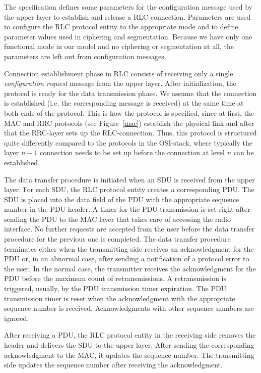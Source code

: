 \documentclass{entcs} \usepackage{entcsmacro}
\begin{document}
The specification defines some parameters for the configuration
message used by the upper layer to establish and release a RLC
connection. Parameters are used to configure the RLC protocol entity
to the appropriate mode and to define parameter values used in
ciphering and segmentation. Because we have only one functional mode
in our model and no ciphering or segmentation at all, the parameters
are left out from configuration messages.

Connection establishment phase in RLC consists of receiving only a
single {\em configuration request} message from the upper layer. After
initialization, the protocol is ready for the data transmission phase.
We assume that the connection is established (i.e. the corresponding
message is received) at the same time at both ends of the
protocol. This is how the protocol is specified, since at first, the
MAC and RRC protocols (see Figure~\ref{mac}) establish the physical
link and after that the RRC-layer sets up the RLC-connection. Thus,
this protocol is structured quite differently compared to the protocols in
the OSI-stack, where typically the layer $n-1$ connection needs to be
set up before the connection at level $n$ can be established.

The data transfer procedure is initiated when an SDU is received from
the upper layer. For each SDU, the RLC protocol entity creates a
corresponding PDU. The SDU is placed into the data field of the PDU
with the appropriate sequence number in the PDU header. A timer for
the PDU transmission is set right after sending the PDU to the MAC
layer that takes care of accessing the radio interface.  No further
requests are accepted from the user before the data transfer procedure
for the previous one is completed.  The data transfer procedure terminates
either when the transmitting side receives an acknowledgment for the
PDU or, in an abnormal case, after sending a notification of a
protocol error to the user. In the normal case, the transmitter
receives the acknowledgment for the PDU before the maximum count of
retransmissions. A retransmission is triggered, usually, by the PDU
transmission timer expiration. The PDU transmission timer is reset
when the acknowledgment with the appropriate sequence number is
received. Acknowledgments with other sequence numbers are ignored.

After receiving a PDU, the RLC protocol entity in the receiving side
removes the header and delivers the SDU to the upper layer. After
sending the corresponding acknowledgment to the MAC, it updates
the sequence number. The transmitting side updates the
sequence number after receiving the acknowledgment.
\end{document}
